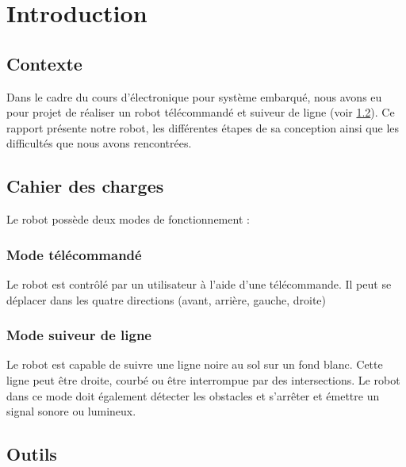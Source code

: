 \chapter{Introduction}

\section{Contexte}

Dans le cadre du cours d'électronique pour système embarqué,
nous avons eu pour projet de réaliser un robot télécommandé et suiveur de ligne (voir \ref{cahier_des_charges}).
Ce rapport présente notre robot, les différentes étapes de sa conception ainsi que les difficultés que nous avons rencontrées.

\section{Cahier des charges} \label{cahier_des_charges}

Le robot possède deux modes de fonctionnement :

\subsection{Mode télécommandé}

Le robot est contrôlé par un utilisateur à l'aide d'une télécommande.
Il peut se déplacer dans les quatre directions (avant, arrière, gauche, droite)

\subsection{Mode suiveur de ligne}

Le robot est capable de suivre une ligne noire au sol sur un fond blanc.
Cette ligne peut être droite, courbé ou être interrompue par des intersections.
Le robot dans ce mode doit également détecter les obstacles et s'arrêter et émettre un signal sonore ou lumineux.

\section{Outils}

